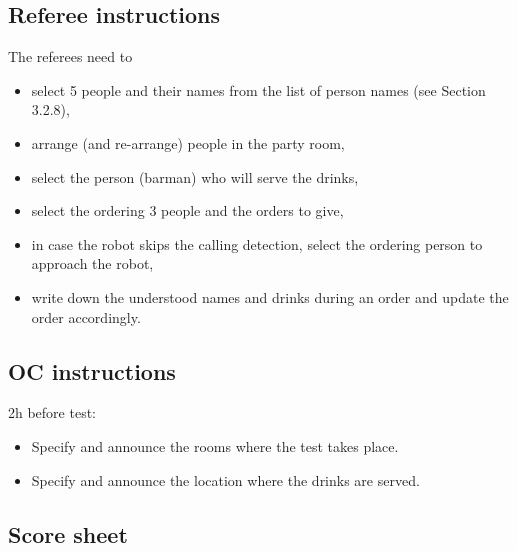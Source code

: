 \subsection{Referee instructions}

The referees need to
\begin{itemize}
	\item select 5 people and their names from the list of person names (see Section 3.2.8),
	\item arrange (and re-arrange) people in the party room,
	\item select the person (barman) who will serve the drinks,
	\item select the ordering 3 people and the orders to give,
	\item in case the robot skips the calling detection, select the ordering person to approach the robot,
	\item write down the understood names and drinks during an order and update the order accordingly.
\end{itemize}

\subsection{OC instructions}

2h before test:
\begin{itemize}
	\item Specify and announce the rooms where the test takes place.
	\item Specify and announce the location where the drinks are served.
\end{itemize}

\subsection{Score sheet}
